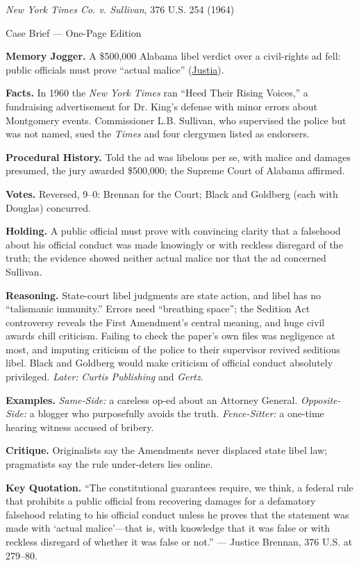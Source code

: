 \documentclass[12pt]{article}
\begin{document}
\begin{center}
{\Large \textit{New York Times Co. v. Sullivan}, 376 U.S. 254 (1964)\par}
\vspace{0.3em}
{\normalsize Case Brief --- One-Page Edition\par}
\end{center}

\textbf{Memory Jogger.} A \$500,000 Alabama libel verdict over a civil-rights ad fell: public officials must prove ``actual malice'' (\href{https://supreme.justia.com/cases/federal/us/376/254/}{Justia}).

\textbf{Facts.} In 1960 the \textit{New York Times} ran ``Heed Their Rising Voices,'' a fundraising advertisement for Dr. King's defense with minor errors about Montgomery events. Commissioner L.B. Sullivan, who supervised the police but was not named, sued the \textit{Times} and four clergymen listed as endorsers.

\textbf{Procedural History.} Told the ad was libelous per se, with malice and damages presumed, the jury awarded \$500,000; the Supreme Court of Alabama affirmed.

\textbf{Votes.} Reversed, 9--0: Brennan for the Court; Black and Goldberg (each with Douglas) concurred.

\textbf{Holding.} A public official must prove with convincing clarity that a falsehood about his official conduct was made knowingly or with reckless disregard of the truth; the evidence showed neither actual malice nor that the ad concerned Sullivan.

\textbf{Reasoning.} State-court libel judgments are state action, and libel has no ``talismanic immunity.'' Errors need ``breathing space''; the Sedition Act controversy reveals the First Amendment's central meaning, and huge civil awards chill criticism. Failing to check the paper's own files was negligence at most, and imputing criticism of the police to their supervisor revived seditious libel. Black and Goldberg would make criticism of official conduct absolutely privileged. \emph{Later:} \textit{Curtis Publishing} and \textit{Gertz}.

\textbf{Examples.} \emph{Same-Side:} a careless op-ed about an Attorney General. \emph{Opposite-Side:} a blogger who purposefully avoids the truth. \emph{Fence-Sitter:} a one-time hearing witness accused of bribery.

\textbf{Critique.} Originalists say the Amendments never displaced state libel law; pragmatists say the rule under-deters lies online.

\textbf{Key Quotation.} ``The constitutional guarantees require, we think, a federal rule that prohibits a public official from recovering damages for a defamatory falsehood relating to his official conduct unless he proves that the statement was made with `actual malice'---that is, with knowledge that it was false or with reckless disregard of whether it was false or not.'' --- Justice Brennan, 376 U.S. at 279--80.
\end{document}
